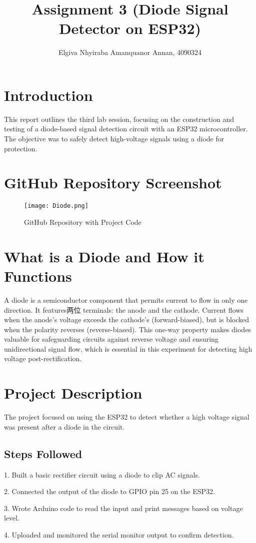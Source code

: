 \documentclass{article}
\title{Assignment 3 (Diode Signal Detector on ESP32)}
\author{Elgiva Nhyiraba Amanquanor Annan, 4090324}
\begin{document}
\maketitle


\section{Introduction}

This report outlines the third lab session, focusing on the construction and testing of a diode-based signal detection circuit with an ESP32 microcontroller. The objective was to safely detect high-voltage signals using a diode for protection.

\section{ GitHub Repository Screenshot}

\begin{figure}[h]
    \centering
    \texttt{[image: Diode.png]}
    \caption{ GitHub Repository with Project Code}
    \label{fig:image}
\end{figure}

\section{What is a Diode and How it Functions}
A diode is a semiconductor component that permits current to flow in only one direction. It features两位 terminals: the anode and the cathode. Current flows when the anode's voltage exceeds the cathode's (forward-biased), but is blocked when the polarity reverses (reverse-biased). This one-way property makes diodes valuable for safeguarding circuits against reverse voltage and ensuring unidirectional signal flow, which is essential in this experiment for detecting high voltage post-rectification.
\section{Project Description}
The project focused on using the ESP32 to detect whether a high voltage signal was present after a diode in the circuit.

\subsection{Steps Followed}

 \item  1. Built a basic rectifier circuit using a diode to clip AC signals.
 \item  2. Connected the output of the diode to GPIO pin 25 on the ESP32.
 \item  3. Wrote Arduino code to read the input and print messages based on voltage level.
 \item  4. Uploaded and monitored the serial monitor output to confirm detection.
\end{document}
